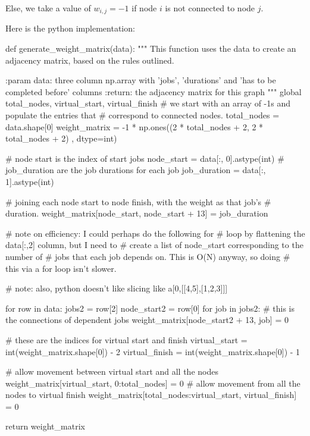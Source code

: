 \documentclass[paper=a4, fontsize=12pt]{scrartcl} %
\numberwithin{equation}{section}       %
\numberwithin{figure}{section}         %
\numberwithin{table}{section}          %
\begin{document}
Else, we take a value of $w_{i,j} = -1$ if node $i$ is not connected to node $j$. 

Here is the python implementation:

\begin{python}
def generate_weight_matrix(data):
    """
    This function uses the data to create an adjacency matrix, based
    on the rules outlined.

    :param data: three column np.array with 'jobs', 'durations'
    and 'has to be completed before' columns
    :return: the adjacency matrix for this graph
    """
    global total_nodes, virtual_start, virtual_finish
    # we start with an array of -1s and populate the entries that
    # correspond to connected nodes.
    total_nodes = data.shape[0]
    weight_matrix = -1 * np.ones((2 * total_nodes + 2, 2 * total_nodes + 2)
                                 , dtype=int)

    # node start is the index of start jobs
    node_start = data[:, 0].astype(int)
    # job_duration are the job durations for each job
    job_duration = data[:, 1].astype(int)

    # joining each node start to node finish, with the weight as that job's
    # duration.
    weight_matrix[node_start, node_start + 13] = job_duration

    # note on efficiency: I could perhaps do the following for
    # loop by flattening the data[:,2] column, but I need to
    # create a list of node_start corresponding to the number of
    # jobs that each job depends on. This is O(N) anyway, so doing
    # this via a for loop isn't slower.

    # note: also, python doesn't like slicing like a[0,[[4,5],[1,2,3]]]

    for row in data:
        jobs2 = row[2]
        node_start2 = row[0]
        for job in jobs2:
            # this is the connections of dependent jobs
            weight_matrix[node_start2 + 13, job] = 0

    # these are the indices for virtual start and finish
    virtual_start = int(weight_matrix.shape[0]) - 2
    virtual_finish = int(weight_matrix.shape[0]) - 1

    # allow movement between virtual start and all the nodes
    weight_matrix[virtual_start, 0:total_nodes] = 0
    # allow movement from all the nodes to virtual finish
    weight_matrix[total_nodes:virtual_start, virtual_finish] = 0

    return weight_matrix
\end{python}
\end{document}
